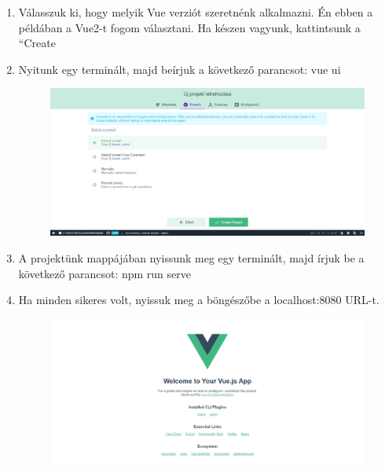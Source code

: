 \begin{enumerate}
  \item Válasszuk ki, hogy melyik Vue verziót szeretnénk alkalmazni. Én ebben a példában a Vue2-t fogom választani. Ha készen vagyunk, kattintsunk a “Create
  \item Nyitunk egy terminált, majd beírjuk a következő parancsot: vue ui
\begin{figure}[h!]
\centering
\includegraphics[width=\textwidth]{images/1617369965789.png}
\label{fig:ff}
\end{figure}
 \item A projektünk mappájában nyissunk meg egy terminált, majd írjuk be a következő parancsot: npm run serve
 \item Ha minden sikeres volt, nyissuk meg a böngészőbe a localhost:8080 URL-t.
	\begin{figure}[h!]
	\centering
	\includegraphics[width=\textwidth]{images/1617370382875.png}
	\label{fig:ff}
	\end{figure}
\end{enumerate}

